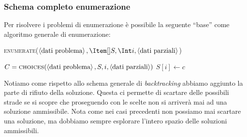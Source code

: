         \subsubsection{Schema completo enumerazione}
            Per risolvere i problemi di enumerazione è possibile la seguente ``base'' come algoritmo generale di enumerazione:
            \begin{algorithm}[H]
                \caption{\textsc{enumerate}($\left<\text{dati problema}\right>, \Item[] S, \Int i, \left<\text{dati parziali}\right>$)}
                \begin{algorithmic}
                     
                        \State {} 
                     
                        \State \Return {}
                    \Else {}
                        \State \Set $C = \Call{choices}{\left<\text{dati problema}\right>, S, i, \left<\text{dati parziali}\right>}$ 
                         
                            \State $S[i] \gets c$ 
                            \State {} 
                        \EndFor
                    \EndIf
                \end{algorithmic}
            \end{algorithm}
            Notiamo come rispetto allo schema generale di \textit{backtracking} abbiamo aggiunto la parte di rifiuto della soluzione. Questa ci permette di scartare delle possibili strade se si scopre che proseguendo con le scelte non si arriverà mai ad una soluzione ammissibile. Nota come nei casi precedenti non possiamo mai scartare una soluzione, ma dobbiamo sempre esplorare l'intero spazio delle soluzioni ammissibili.
